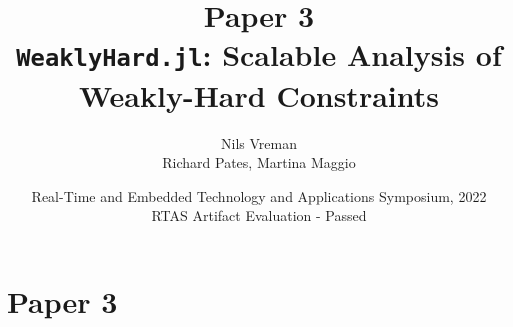 \section{Paper 3}

\title[Preperatory Seminar]{
    {\Huge Paper 3} \\
    \vspace{2mm}
    {\Large {\tt WeaklyHard.jl}: Scalable Analysis of Weakly-Hard Constraints} \\
}
\author[Nils Vreman]{
    Nils Vreman \\
    \vspace{3mm}
    {\large Richard Pates, Martina Maggio}
}
\date[RTAS 2022]{
    Real-Time and Embedded Technology and Applications Symposium, 2022\\
    {\large RTAS Artifact Evaluation - Passed}
}
\notitlelogo
{}

